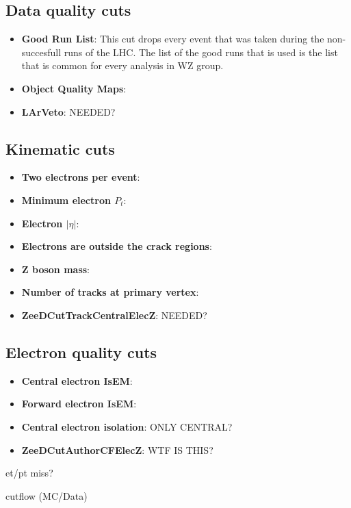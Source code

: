 \subsection{Data quality cuts}
\label{sec:Sel_GRL_OQ}

\begin{itemize}
\item {\bfseries Good Run List}: This cut drops every event that was taken during the non-succesfull runs of the LHC. The list of the good runs that is used is the list that is common for every analysis in WZ group.
\item {\bfseries Object Quality Maps}:
\item {\bfseries LArVeto}: \tbu NEEDED?
\end{itemize}

\subsection{Kinematic cuts}
\label{sec:Sel_kinematic}

\begin{itemize}
\item {\bfseries Two electrons per event}:
\item {\bfseries Minimum electron $P_{t}$}:
\item {\bfseries Electron $|\eta|$}:
\item {\bfseries Electrons are outside the crack regions}:
\item {\bfseries Z boson mass}:
\item {\bfseries Number of tracks at primary vertex}:
\item {\bfseries ZeeDCutTrackCentralElecZ}: \tbu NEEDED?
\end{itemize}

\subsection{Electron quality cuts}
\label{sec:Sel_isem_iso}

\begin{itemize}
\item {\bfseries Central electron IsEM}:
\item {\bfseries Forward electron IsEM}:
\item {\bfseries Central electron isolation}: \tbu ONLY CENTRAL?
\item {\bfseries ZeeDCutAuthorCFElecZ}: \tbu WTF IS THIS?
\end{itemize}

\tbu et/pt miss?

cutflow (MC/Data)
